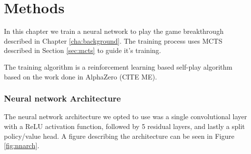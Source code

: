 \chapter{Methods\label{cha:methods}}

In this chapter we train a neural network to play the game breakthrough described in 
Chapter \ref{cha:background}. The training process uses MCTS described in Section \ref{sec:mcts} 
to guide it's training.

The training algorithm is a reinforcement learning based self-play algorithm based on the work 
done in AlphaZero (CITE ME).

\subsection{Neural network Architecture}

The neural network architecture we opted to use was a single convolutional layer with a ReLU 
activation function, followed by 5 residual layers, and lastly a split policy/value head.
A figure describing the architecture can be seen in Figure \ref{fig:nnarch}.

